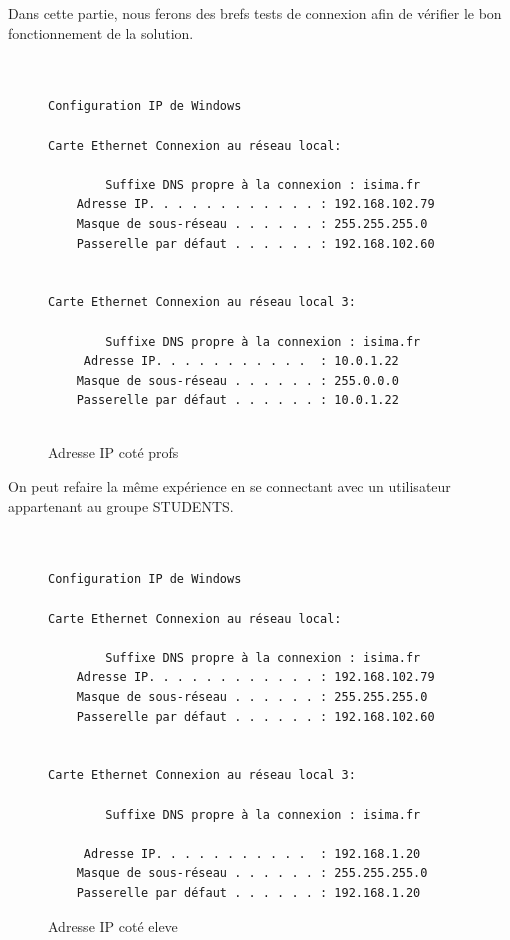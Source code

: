 Dans cette partie, nous ferons des brefs tests de connexion afin de vérifier le bon fonctionnement de la solution.


\begin{figure}[H]
	\begin{center}
		\begin{minipage}{1\textwidth}
			\begin{lstlisting}[frame=trBL]


Configuration IP de Windows

Carte Ethernet Connexion au réseau local:

        Suffixe DNS propre à la connexion : isima.fr
	Adresse IP. . . . . . . . . . . . : 192.168.102.79
	Masque de sous-réseau . . . . . . : 255.255.255.0
	Passerelle par défaut . . . . . . : 192.168.102.60


Carte Ethernet Connexion au réseau local 3:

        Suffixe DNS propre à la connexion : isima.fr
	 Adresse IP. . . . . . . . . . .  : 10.0.1.22
	Masque de sous-réseau . . . . . . : 255.0.0.0
	Passerelle par défaut . . . . . . : 10.0.1.22


			\end{lstlisting}
		\end{minipage}
	\end{center}
	\caption{Adresse IP coté profs}
	\label{Adresse_IP_cote_profs}
\end{figure}


On peut refaire la même expérience en se connectant avec un utilisateur appartenant au groupe STUDENTS.

\begin{figure}[H]
	\begin{center}
		\begin{minipage}{1\textwidth}
			\begin{lstlisting}[frame=trBL]


Configuration IP de Windows

Carte Ethernet Connexion au réseau local:

        Suffixe DNS propre à la connexion : isima.fr
	Adresse IP. . . . . . . . . . . . : 192.168.102.79
	Masque de sous-réseau . . . . . . : 255.255.255.0
	Passerelle par défaut . . . . . . : 192.168.102.60


Carte Ethernet Connexion au réseau local 3:

        Suffixe DNS propre à la connexion : isima.fr
       
	 Adresse IP. . . . . . . . . . .  : 192.168.1.20
	Masque de sous-réseau . . . . . . : 255.255.255.0
	Passerelle par défaut . . . . . . : 192.168.1.20

\end{lstlisting}
		\end{minipage}
	\end{center}
	\caption{Adresse IP coté eleve}
	\label{Adresse_IP_cote_eleve}
\end{figure}

